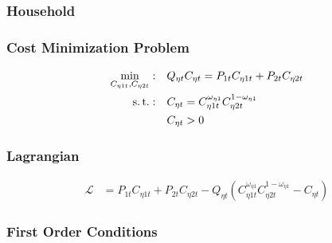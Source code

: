 \documentclass[../thesis.tex]{subfiles}
\begin{document}
\newpage




\subsubsection{Household}

\subsubsection*{Cost Minimization Problem}
	
	\begin{align}
		\min_{C_{\eta 1 t}, C_{\eta 2 t}}: &\quad Q_{\eta t} C_{\eta t} = P_{1 t} C_{\eta 1t} + P_{2 t} C_{\eta 2t} \label{eq_v6:reg-consumption-cost}
		\\
		\operatorname{s.t.}: &\quad C_{\eta t} = C_{\eta 1 t}^{\omega_{\eta 1}} C_{\eta 2 t}^{1-\omega_{\eta 1}} \label{eq_v6:reg-consumption-aggregation} \\
		&\quad C_{\eta t} > 0 \nonumber
	\end{align}

\subsubsection*{Lagrangian}

	\begin{align}
		\mathcal{L} &= P_{1 t} C_{\eta 1t} + P_{2 t} C_{\eta 2t} - Q_{\eta t} (C_{\eta 1 t}^{\omega_{\eta 1}} C_{\eta 2 t}^{1-\omega_{\eta 1}} - C_{\eta t}) \label{eq_v6:reg-consumption-lagrangian}
	\end{align}

\subsubsection*{First Order Conditions}
\end{document}
